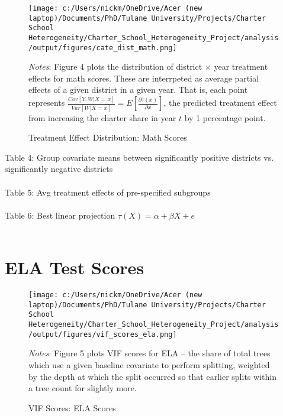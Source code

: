 \documentclass{article} %
\begin{document}
\begin{figure}[H]
\centering
\texttt{[image: c:/Users/nickm/OneDrive/Acer (new laptop)/Documents/PhD/Tulane University/Projects/Charter School Heterogeneity/Charter\_School\_Heterogeneity\_Project/analysis/output/figures/cate\_dist\_math.png]}
\caption{Treatment Effect Distribution: Math Scores}
\label{fig:image4}
\begin{minipage}{1\linewidth}
\singlespacing
\footnotesize
\emph{Notes}: Figure 4 plots the distribution of district $\times$ year treatment effects for math scores. These are interrpeted as average partial effects of a given district in a given year. That is, each point represents $\frac{Cov[Y, W | X = x]}{Var[W | X = x]} = E\left[ \frac{\partial \tau(x)}{\partial x} \right]$, the predicted treatment effect from increasing the charter share in year $t$ by 1 percentage point.
\end{minipage}
\end{figure}


Table 4: Group covariate means between significantly positive districts vs. significantly negative districts\\
\\


Table 5: Avg treatment effects of pre-specified subgroups \\
\\

Table 6: Best linear projection $\tau(X) = \alpha + \beta X + e$\\
\\


	\section{ELA Test Scores}

\begin{figure}[H]
\centering
\texttt{[image: c:/Users/nickm/OneDrive/Acer (new laptop)/Documents/PhD/Tulane University/Projects/Charter School Heterogeneity/Charter\_School\_Heterogeneity\_Project/analysis/output/figures/vif\_scores\_ela.png]}
\caption{VIF Scores: ELA Scores}
\label{fig:image5}
\begin{minipage}{1\linewidth}
\singlespacing
\footnotesize
\emph{Notes}: Figure 5 plots VIF scores for ELA -- the share of total trees which use a given baseline covariate to perform splitting, weighted by the depth at which the split occurred so that earlier splits within a tree count for slightly more.  
\end{minipage}
\end{figure}
\end{document}
